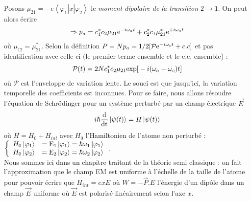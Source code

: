 Posons ${\mu _{21}} =  - e\left\langle {{\varphi _1}} \right|x\left| {{\varphi _2}} \right\rangle $ le \textit{moment dipolaire de la transition $2\to1$}. On peut alors écrire
\begin{equation}
 \Rightarrow {p_a} = c_1^*{c_2}{\mu _{21}}{{\rm{e}}^{ - i{\omega _a}t}} + c_2^*{c_1}\mu _{21}^*{{\rm{e}}^{ + i{\omega _a}t}}
\end{equation}
où ${\mu _{12}} = \mu _{21}^*$. Selon la définition $P = N{p_a} = 1/2[{\cal P}{{\rm{e}}^{ - i{\omega _c}t}} + c.c]$ et pas identification avec celle-ci (le premier terme ensemble et le c.c. ensemble) :
\begin{equation}
{\cal P}(t) = 2Nc_1^*{c_2}{\mu _{21}}{\rm{exp[}} - i({\omega _a} - {\omega _c})t]
\label{eq:ch3.1}
\end{equation}
où $\mathcal{P}$ est l'enveloppe de variation lente. Le souci est que jusqu'ici, la variation 
temporelle des coefficients est inconnues. Pour se faire, nous allons résoudre l'équation de 
Schrödinger pour un système perturbé par un champ électrique $\vec{E}$
\begin{equation}
i\hbar \frac{{\rm{d}}}{{{\rm{dt}}}}\left| {\psi (t)} \right\rangle  = {H}\left| {\psi (t)} \right\rangle 
\end{equation}
où $H=H_0+H_{int}$ avec $H_0$ l'Hamiltonien de l'atome non perturbé : $\displaystyle\left\{\begin{array}{ll}
{{H}_0}\left| {{\varphi _1}} \right\rangle  &= {{\rm{E}}_1}\left| {{\varphi _1}} \right\rangle  = \hbar {\omega _1}\left| {{\varphi _1}} \right\rangle\\
{{H}_0}\left| {{\varphi _2}} \right\rangle  &= {{\rm{E}}_2}\left| {{\varphi _2}} \right\rangle  = \hbar {\omega _2}\left| {{\varphi _2}} \right\rangle
\end{array}\right.$. \\

Nous sommes ici dans un chapitre traitant de la théorie semi classique : on fait l'approximation 
que le champ EM est uniforme à l'échelle de la taille de l'atome pour pouvoir écrire que 
$H_{int} = exE$ où $W=-\vec{P}.E$ l'énergie d'un dipôle dans un champ $\vec{E}$ uniforme où 
$\vec{E}$ est polarisé linéairement selon l'axe $x$.\\

